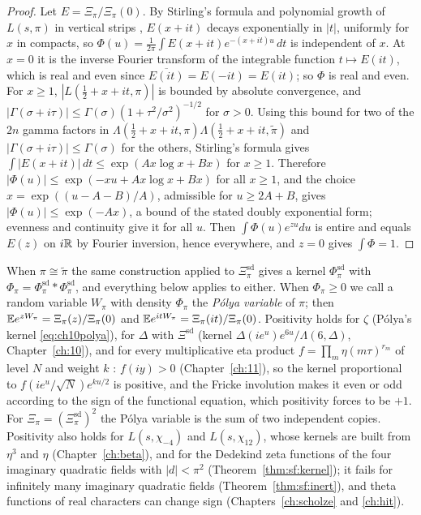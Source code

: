 \begin{proof}
Let $E = \Xi_\pi/\Xi_\pi(0)$. By Stirling's formula and polynomial growth of $L(s,\pi)$ in vertical strips \cite{iwanieckowalski2004}, $E(x+it)$ decays exponentially in $|t|$, uniformly for $x$ in compacts, so $\Phi(u) = \frac1{2\pi}\int E(x+it)e^{-(x+it)u}\,dt$ is independent of $x$. At $x=0$ it is the inverse Fourier transform of the integrable function $t\mapsto E(it)$, which is real and even since $\overline{E(it)} = E(-it) = E(it)$; so $\Phi$ is real and even. For $x\ge1$, $|L(\frac12+x+it,\pi)|$ is bounded by absolute convergence, and $|\Gamma(\sigma+i\tau)|\le\Gamma(\sigma)(1+\tau^2/\sigma^2)^{-1/2}$ for $\sigma>0$. Using this bound for two of the $2n$ gamma factors in $\Lambda(\frac12+x+it,\pi)\Lambda(\frac12+x+it,\tilde\pi)$ and $|\Gamma(\sigma+i\tau)|\le\Gamma(\sigma)$ for the others, Stirling's formula gives $\int|E(x+it)|\,dt\le\exp(Ax\log x+Bx)$ for $x\ge1$. Therefore $|\Phi(u)|\le\exp(-xu+Ax\log x+Bx)$ for all $x\ge1$, and the choice $x = \exp((u-A-B)/A)$, admissible for $u\ge2A+B$, gives $|\Phi(u)|\le\exp(-Ax)$, a bound of the stated doubly exponential form; evenness and continuity give it for all $u$. Then $\int\Phi(u)e^{zu}du$ is entire and equals $E(z)$ on $i\mathbb{R}$ by Fourier inversion, hence everywhere, and $z=0$ gives $\int\Phi=1$.
\end{proof}

When $\pi\cong\tilde\pi$ the same construction applied to $\Xi^{\mathrm{sd}}_\pi$ gives a kernel $\Phi^{\mathrm{sd}}_\pi$ with $\Phi_\pi = \Phi^{\mathrm{sd}}_\pi*\Phi^{\mathrm{sd}}_\pi$, and everything below applies to either. When $\Phi_\pi\ge0$ we call a random variable $W_\pi$ with density $\Phi_\pi$ the \emph{P\'olya variable} of $\pi$; then $\mathbb{E} e^{zW_\pi} = \Xi_\pi(z)/\Xi_\pi(0)$ and $\mathbb{E} e^{itW_\pi} = \Xi_\pi(it)/\Xi_\pi(0)$. Positivity holds for $\zeta$ (P\'olya's kernel \eqref{eq:ch10polya}), for $\Delta$ with $\Xi^{\mathrm{sd}}$ (kernel $\Delta(ie^u)e^{6u}/\Lambda(6,\Delta)$, Chapter~\ref{ch:10}), and for every multiplicative eta product $f = \prod_m\eta(m\tau)^{r_m}$ of level $N$ and weight $k$ \cite{dkm1985}: $f(iy)>0$ (Chapter~\ref{ch:11}), so the kernel proportional to $f(ie^u/\sqrt N)e^{ku/2}$ is positive, and the Fricke involution makes it even or odd according to the sign of the functional equation, which positivity forces to be $+1$. For $\Xi_\pi = (\Xi^{\mathrm{sd}}_\pi)^2$ the P\'olya variable is the sum of two independent copies. Positivity also holds for $L(s,\chi_{-4})$ and $L(s,\chi_{12})$, whose kernels are built from $\eta^3$ and $\eta$ (Chapter~\ref{ch:beta}), and for the Dedekind zeta functions of the four imaginary quadratic fields with $|d|<\pi^2$ (Theorem~\ref{thm:sf:kernel}); it fails for infinitely many imaginary quadratic fields (Theorem~\ref{thm:sf:inert}), and theta functions of real characters can change sign (Chapters~\ref{ch:scholze} and \ref{ch:hit}).

